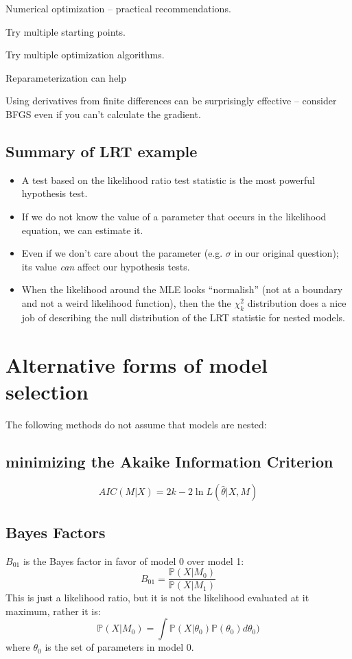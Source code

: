 \documentclass[landscape]{foils}
\renewcommand{\Pr}{\mathbb{P}}
\begin{document}
\myNewSlide
\Large
Numerical optimization -- practical recommendations.
\begin{compactenum}
  \item Try multiple starting points.
  \item Try multiple optimization algorithms.
  \item Reparameterization can help
  \item Using derivatives from finite differences can be surprisingly effective -- consider BFGS even if you can't calculate the gradient.
\end{compactenum}

\myNewSlide
\subsection*{Summary of LRT example}
\normalsize
\begin{itemize}
  \item A test based on the likelihood ratio test statistic is the most powerful hypothesis test.
  \item If we do not know the value of a parameter that occurs in the likelihood equation, we can estimate it.
  \item Even if we don't care about the parameter (e.g. $\sigma$ in our original question); its value {\em can} affect our hypothesis tests. 
  \item When the likelihood around the MLE looks ``normalish'' (not at a boundary and not a weird likelihood function), then the the $\chi_k^2$ distribution does a nice job of describing the null distribution of the LRT statistic for nested models.
\end{itemize}
\myNewSlide
\section*{Alternative forms of model selection}
The following methods do not assume that models are nested:
\subsection*{minimizing the Akaike Information Criterion}
  $$AIC(M|X) = 2k - 2 \ln L(\hat\theta | X, M)$$

\subsection*{Bayes Factors}
$B_{01}$ is the Bayes factor in favor of model 0 over model 1:
$$B_{01} = \frac{\Pr(X|M_0)}{\Pr(X|M_1)}$$
This is just a likelihood ratio, but it is not the likelihood evaluated at it maximum, rather it is:
\begin{equation}
  \Pr(X|M_0) = \int \Pr(X|\theta_0)\Pr(\theta_0) d\theta_0) \label{margLike}
\end{equation}
where $\theta_0$ is the set of parameters in model 0.
\end{document}
